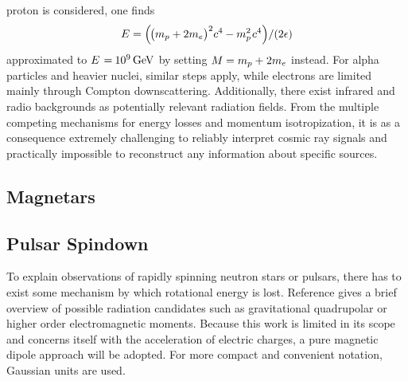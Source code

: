 proton is considered, one finds
\begin{equation*}
	E = \Bigl( \kern-1.0pt \bigl( m_p + 2m_e \bigr)^2 c^4 \kern-0.2pt - m_p^2 \kern+0.8pt c^4 \Bigr) / (2\epsilon)
\end{equation*}
approximated to $E \kern+1.0pt = \kern-0.5pt \qty{e+9}{\giga\electronvolt}$ by setting $M \kern-0.3pt = m_p + \kern+0.3pt 2m_e$
instead. For alpha particles and heavier nuclei, similar steps apply, while electrons are limited mainly through Compton
downscattering. Additionally, there exist infrared and radio backgrounds as potentially relevant radiation fields. From
the multiple competing mechanisms for energy losses and momentum isotropization, it is as a consequence extremely challenging
to reliably interpret cosmic ray signals and practically impossible to reconstruct any information about specific sources.



\subsection{Magnetars}
\label{sub:magnetars}



\subsection{Pulsar Spindown}
\label{sub:spindown}

To explain observations of rapidly spinning neutron stars or pulsars, there has to exist some mechanism by which rotational energy is
lost. Reference \cite{Alvarez_2004} gives a brief overview of possible radiation candidates such as gravitational quadrupolar or
higher order electromagnetic moments. Because this work is limited in its scope and concerns itself with the acceleration of
electric charges, a pure magnetic dipole approach will be adopted. For more compact and convenient notation, Gaussian units are used.

